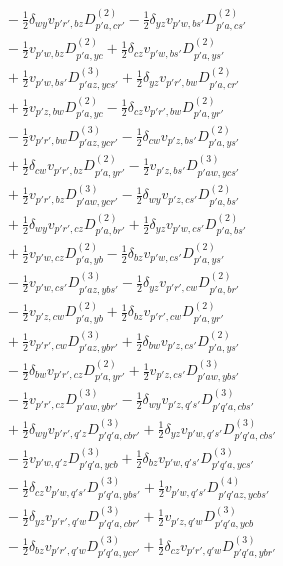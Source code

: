 \begin{align*}
&\quad -\tfrac12\delta_{wy}v_{p'r',bz}D^{(2)}_{p'a,cr'}-\tfrac12\delta_{yz}v_{p'w,bs'}D^{(2)}_{p'a,cs'} \\
&\quad -\tfrac12v_{p'w,bz}D^{(2)}_{p'a,yc}+\tfrac12\delta_{cz}v_{p'w,bs'}D^{(2)}_{p'a,ys'} \\
&\quad +\tfrac12v_{p'w,bs'}D^{(3)}_{p'az,ycs'}+\tfrac12\delta_{yz}v_{p'r',bw}D^{(2)}_{p'a,cr'} \\
&\quad +\tfrac12v_{p'z,bw}D^{(2)}_{p'a,yc}-\tfrac12\delta_{cz}v_{p'r',bw}D^{(2)}_{p'a,yr'} \\
&\quad -\tfrac12v_{p'r',bw}D^{(3)}_{p'az,ycr'}-\tfrac12\delta_{cw}v_{p'z,bs'}D^{(2)}_{p'a,ys'} \\
&\quad +\tfrac12\delta_{cw}v_{p'r',bz}D^{(2)}_{p'a,yr'}-\tfrac12v_{p'z,bs'}D^{(3)}_{p'aw,ycs'} \\
&\quad +\tfrac12v_{p'r',bz}D^{(3)}_{p'aw,ycr'}-\tfrac12\delta_{wy}v_{p'z,cs'}D^{(2)}_{p'a,bs'} \\
&\quad +\tfrac12\delta_{wy}v_{p'r',cz}D^{(2)}_{p'a,br'}+\tfrac12\delta_{yz}v_{p'w,cs'}D^{(2)}_{p'a,bs'} \\
&\quad +\tfrac12v_{p'w,cz}D^{(2)}_{p'a,yb}-\tfrac12\delta_{bz}v_{p'w,cs'}D^{(2)}_{p'a,ys'} \\
&\quad -\tfrac12v_{p'w,cs'}D^{(3)}_{p'az,ybs'}-\tfrac12\delta_{yz}v_{p'r',cw}D^{(2)}_{p'a,br'} \\
&\quad -\tfrac12v_{p'z,cw}D^{(2)}_{p'a,yb}+\tfrac12\delta_{bz}v_{p'r',cw}D^{(2)}_{p'a,yr'} \\
&\quad +\tfrac12v_{p'r',cw}D^{(3)}_{p'az,ybr'}+\tfrac12\delta_{bw}v_{p'z,cs'}D^{(2)}_{p'a,ys'} \\
&\quad -\tfrac12\delta_{bw}v_{p'r',cz}D^{(2)}_{p'a,yr'}+\tfrac12v_{p'z,cs'}D^{(3)}_{p'aw,ybs'} \\
&\quad -\tfrac12v_{p'r',cz}D^{(3)}_{p'aw,ybr'}-\tfrac12\delta_{wy}v_{p'z,q's'}D^{(3)}_{p'q'a,cbs'} \\
&\quad +\tfrac12\delta_{wy}v_{p'r',q'z}D^{(3)}_{p'q'a,cbr'}+\tfrac12\delta_{yz}v_{p'w,q's'}D^{(3)}_{p'q'a,cbs'} \\
&\quad -\tfrac12v_{p'w,q'z}D^{(3)}_{p'q'a,ycb}+\tfrac12\delta_{bz}v_{p'w,q's'}D^{(3)}_{p'q'a,ycs'} \\
&\quad -\tfrac12\delta_{cz}v_{p'w,q's'}D^{(3)}_{p'q'a,ybs'}+\tfrac12v_{p'w,q's'}D^{(4)}_{p'q'az,ycbs'} \\
&\quad -\tfrac12\delta_{yz}v_{p'r',q'w}D^{(3)}_{p'q'a,cbr'}+\tfrac12v_{p'z,q'w}D^{(3)}_{p'q'a,ycb} \\
&\quad -\tfrac12\delta_{bz}v_{p'r',q'w}D^{(3)}_{p'q'a,ycr'}+\tfrac12\delta_{cz}v_{p'r',q'w}D^{(3)}_{p'q'a,ybr'} \\

\end{align*}
